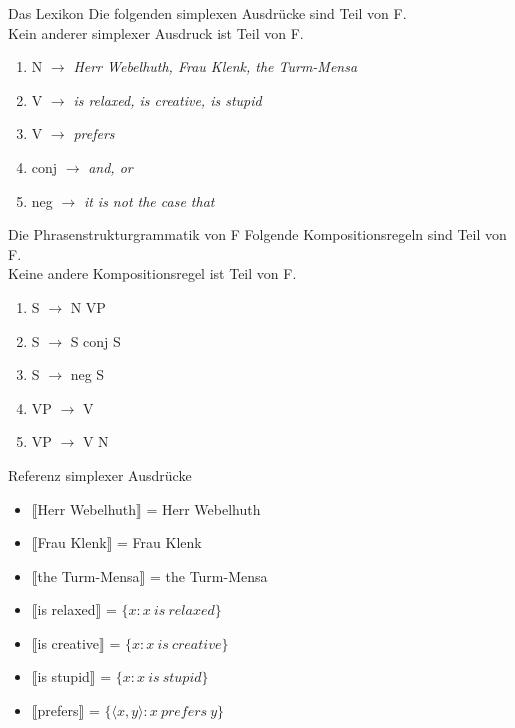 \begin{frame}
  {Das Lexikon}
  \onslide<+->
  \onslide<+->
  Die folgenden simplexen Ausdrücke sind Teil von F.\\
  \onslide<+->
  Kein anderer simplexer Ausdruck ist Teil von F.\\
  \Halbzeile
  \begin{enumerate}[<+->]
    \item N $\rightarrow$ \emph{Herr Webelhuth, Frau Klenk, the Turm-Mensa} \label{lex01}
    \item V $\rightarrow$ \emph{is relaxed, is creative, is stupid} \label{lex02}
    \item V $\rightarrow$ \emph{prefers} \label{lex03}
    \item conj $\rightarrow$ \emph{and, or} \label{lex04}
    \item neg $\rightarrow$ \emph{it is not the case that} \label{lex05}
  \end{enumerate}
\end{frame}

\begin{frame}
  {Die Phrasenstrukturgrammatik von F}
  \onslide<+->
  \onslide<+->
  Folgende Kompositionsregeln sind Teil von F.\\
  Keine andere Kompositionsregel ist Teil von F.\\
  \Halbzeile
  \begin{enumerate}[<+->]
    \item S $\rightarrow$ N VP \label{syn01}
    \item S $\rightarrow$ S conj S \label{syn02}
    \item S $\rightarrow$ neg S \label{syn03}
    \item VP $\rightarrow$ V \label{syn04}
    \item VP $\rightarrow$ V N \label{syn05}
  \end{enumerate}
\end{frame}

\begin{frame}
  {Referenz simplexer Ausdrücke}
  \begin{itemize}[<+->]
    \item $\llbracket$Herr Webelhuth$\rrbracket$ = Herr Webelhuth \label{lexint01}
    \item $\llbracket$Frau Klenk$\rrbracket$ = Frau Klenk \label{lexint02}
    \item $\llbracket$the Turm-Mensa$\rrbracket$ = the Turm-Mensa \label{lexint03}
    \item $\llbracket$is relaxed$\rrbracket$ = $\{x:x\ is\ relaxed\}$ \label{lexint04}
    \item $\llbracket$is creative$\rrbracket$ = $\{x:x\ is\ creative\}$ \label{lexint05}
    \item $\llbracket$is stupid$\rrbracket$ = $\{x:x\ is\ stupid\}$ \label{lexint06}
    \item $\llbracket$prefers$\rrbracket$ = $\{\langle x,y\rangle: x\ prefers\ y\}$ \label{lexint07}
  \end{itemize}
\end{frame}

